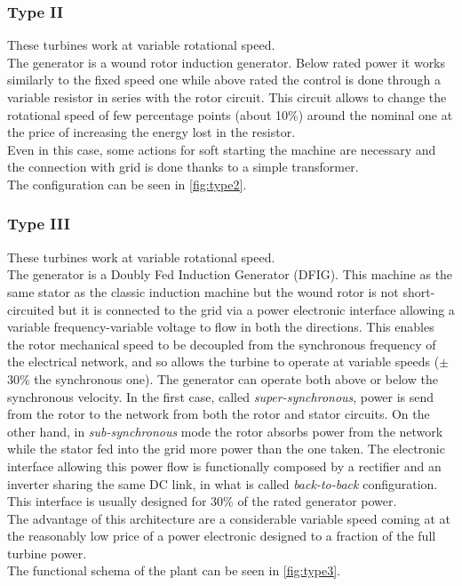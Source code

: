 \subsubsection{Type II}
These turbines work at variable rotational speed. \\
The generator is a wound rotor induction generator. Below rated power it works similarly to the fixed speed one while above rated the control is done through a variable resistor in series with the rotor circuit. This circuit allows to change the rotational speed of few percentage points (about 10\%) around the nominal one at the price of increasing the energy lost in the resistor.\\ 
Even in this case, some actions for soft starting the machine are necessary and the connection with grid is done thanks to a simple transformer.\\
The configuration can be seen in \autoref{fig:type2}.

\subsubsection{Type III}
These turbines work at variable rotational speed. \\
The generator is a Doubly Fed Induction Generator (DFIG). This machine as the same stator as the classic induction machine but the wound rotor is not short-circuited but it is connected to the grid via a power electronic interface allowing a variable frequency-variable voltage to flow in both the directions. This enables the rotor mechanical speed to be decoupled from the synchronous frequency of the electrical network, and so allows the turbine to operate at variable speeds ($\pm$ 30\% the synchronous one). The generator can operate both above or below the synchronous velocity. In the first case, called \textit{super-synchronous}, power is send from the rotor to the network from both the rotor and stator circuits. On the other hand, in \textit{sub-synchronous} mode the rotor absorbs power from the network while the stator fed into the grid more power than the one taken. The electronic interface allowing this power flow is functionally composed by a rectifier and an inverter sharing the same DC link, in what is called \textit{back-to-back} configuration. This interface is usually designed for 30\% of the rated generator power.\\
The advantage of this architecture are a considerable variable speed coming at at the reasonably low price of a power electronic designed to a fraction of the full turbine power.\\  
The functional schema of the plant can be seen in \autoref{fig:type3}.

